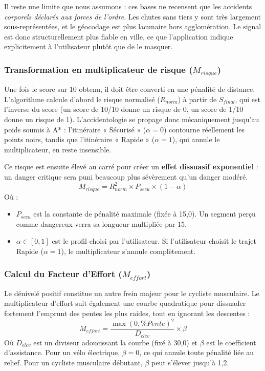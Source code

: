 Il reste une limite que nous assumons : ces bases ne recensent que les accidents \emph{corporels déclarés aux forces de l'ordre}. Les chutes sans tiers y sont très largement sous-représentées, et le géocodage est plus lacunaire hors agglomération. Le signal est donc structurellement plus fiable en ville, ce que l'application indique explicitement à l'utilisateur plutôt que de le masquer.

\subsubsection{Transformation en multiplicateur de risque ($M_{risque}$)}
Une fois le score sur 10 obtenu, il doit être converti en une pénalité de distance. 
L'algorithme calcule d'abord le risque normalisé ($R_{norm}$) à partir de $S_{final}$, qui est l'inverse du score (un score de 10/10 donne un risque de 0, un score de 1/10 donne un risque de 1). L'accidentologie se propage donc mécaniquement jusqu'au poids soumis à A* : l'itinéraire « Sécurisé » ($\alpha = 0$) contourne réellement les points noirs, tandis que l'itinéraire « Rapide » ($\alpha = 1$), qui annule le multiplicateur, en reste insensible.

Ce risque est ensuite élevé au carré pour créer un \textbf{effet dissuasif exponentiel} : un danger critique sera puni beaucoup plus sévèrement qu'un danger modéré.
\begin{equation}
    M_{risque} = R_{norm}^2 \times P_{secu} \times (1 - \alpha)
\end{equation}
Où :
\begin{itemize}
    \item $P_{secu}$ est la constante de pénalité maximale (fixée à 15,0). Un segment perçu comme dangereux verra sa longueur multipliée par 15.
    \item $\alpha \in [0, 1]$ est le profil choisi par l'utilisateur. Si l'utilisateur choisit le trajet Rapide ($\alpha = 1$), le multiplicateur s'annule complètement.
\end{itemize}

\subsubsection{Calcul du Facteur d'Effort ($M_{effort}$)}
Le dénivelé positif constitue un autre frein majeur pour le cycliste musculaire. Le multiplicateur d'effort suit également une courbe quadratique pour dissuader fortement l'emprunt des pentes les plus raides, tout en ignorant les descentes :
\begin{equation}
    M_{effort} = \frac{\max(0, \%Pente)^2}{D_{elev}} \times \beta
\end{equation}
Où $D_{elev}$ est un diviseur adoucissant la courbe (fixé à 30,0) et $\beta$ est le coefficient d'assistance. Pour un vélo électrique, $\beta = 0$, ce qui annule toute pénalité liée au relief. Pour un cycliste musculaire débutant, $\beta$ peut s'élever jusqu'à 1,2.

